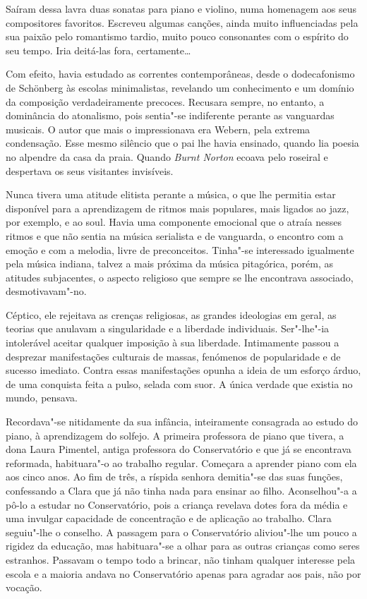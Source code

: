 Saíram dessa lavra duas sonatas para piano e violino, numa homenagem aos
seus compositores favoritos. Escreveu algumas canções, ainda muito
influenciadas pela sua paixão pelo romantismo tardio, muito pouco
consonantes com o espírito do seu tempo. Iria deitá-las fora,
certamente\ldots{}

Com efeito, havia estudado as correntes contemporâneas, desde o
dodecafonismo de Schönberg às escolas minimalistas, revelando um
conhecimento e um domínio da composição verdadeiramente precoces.
Recusara sempre, no entanto, a dominância do atonalismo, pois sentia"-se
indiferente perante as vanguardas musicais. O autor que mais o
impressionava era Webern, pela extrema condensação. Esse mesmo silêncio
que o pai lhe havia ensinado, quando lia poesia no alpendre da casa da
praia. Quando \emph{Burnt Norton }ecoava pelo roseiral e despertava os
seus visitantes invisíveis.

Nunca tivera uma atitude elitista perante a música, o que lhe permitia
estar disponível para a aprendizagem de ritmos mais populares, mais
ligados ao jazz, por exemplo, e ao soul. Havia uma componente emocional
que o atraía nesses ritmos e que não sentia na música serialista e de
vanguarda, o encontro com a emoção e com a melodia, livre de
preconceitos. Tinha"-se interessado igualmente pela música indiana,
talvez a mais próxima da música pitagórica, porém, as atitudes
subjacentes, o aspecto religioso que sempre se lhe encontrava associado,
desmotivavam"-no.

Céptico, ele rejeitava as crenças religiosas, as grandes ideologias em
geral, as teorias que anulavam a singularidade e a liberdade
individuais. Ser"-lhe"-ia intolerável aceitar qualquer imposição à sua
liberdade. Intimamente passou a desprezar manifestações culturais de
massas, fenómenos de popularidade e de sucesso imediato. Contra essas
manifestações opunha a ideia de um esforço árduo, de uma conquista feita
a pulso, selada com suor. A única verdade que existia no mundo, pensava.

Recordava"-se nitidamente da sua infância, inteiramente consagrada ao
estudo do piano, à aprendizagem do solfejo. A primeira professora de
piano que tivera, a dona Laura Pimentel, antiga professora do
Conservatório e que já se encontrava reformada, habituara"-o ao trabalho
regular. Começara a aprender piano com ela aos cinco anos. Ao fim de
três, a ríspida senhora demitia"-se das suas funções, confessando a Clara
que já não tinha nada para ensinar ao filho. Aconselhou"-a a pô-lo a
estudar no Conservatório, pois a criança revelava dotes fora da média e
uma invulgar capacidade de concentração e de aplicação ao trabalho.
Clara seguiu"-lhe o conselho. A passagem para o Conservatório aliviou"-lhe
um pouco a rigidez da educação, mas habituara"-se a olhar para as outras
crianças como seres estranhos. Passavam o tempo todo a brincar, não
tinham qualquer interesse pela escola e a maioria andava no
Conservatório apenas para agradar aos pais, não por vocação.

